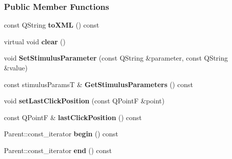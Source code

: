 \subsubsection*{Public Member Functions}
\begin{DoxyCompactItemize}
\item
\hypertarget{classapex_1_1_screen_result_af8e8f27a296d78d107947a315d6df1f1}{const Q\-String {\bfseries to\-X\-M\-L} () const }\label{classapex_1_1_screen_result_af8e8f27a296d78d107947a315d6df1f1}

\item
\hypertarget{classapex_1_1_screen_result_aef926fa16cabe427f26a7b265c150e92}{virtual void {\bfseries clear} ()}\label{classapex_1_1_screen_result_aef926fa16cabe427f26a7b265c150e92}

\item
\hypertarget{classapex_1_1_screen_result_a62dcb7eb2d37d51231970bb6a6b8db5f}{void {\bfseries Set\-Stimulus\-Parameter} (const Q\-String \&parameter, const Q\-String \&value)}\label{classapex_1_1_screen_result_a62dcb7eb2d37d51231970bb6a6b8db5f}

\item
\hypertarget{classapex_1_1_screen_result_a8479b6f3f72c7a20823b95fbd85dd765}{const stimulus\-Params\-T \& {\bfseries Get\-Stimulus\-Parameters} () const }\label{classapex_1_1_screen_result_a8479b6f3f72c7a20823b95fbd85dd765}

\item
\hypertarget{classapex_1_1_screen_result_a218e19ab8612f4ba40bf401729f2cfab}{void {\bfseries set\-Last\-Click\-Position} (const Q\-Point\-F \&point)}\label{classapex_1_1_screen_result_a218e19ab8612f4ba40bf401729f2cfab}

\item
\hypertarget{classapex_1_1_screen_result_a82265d3c2086c4c8235af7db6861803a}{const Q\-Point\-F \& {\bfseries last\-Click\-Position} () const }\label{classapex_1_1_screen_result_a82265d3c2086c4c8235af7db6861803a}

\item
\hypertarget{classapex_1_1_screen_result_a7510ab7f870afcb70d2d3e89d0dc2cb8}{Parent\-::const\-\_\-iterator {\bfseries begin} () const }\label{classapex_1_1_screen_result_a7510ab7f870afcb70d2d3e89d0dc2cb8}

\item
\hypertarget{classapex_1_1_screen_result_ae9931a4c9105a4c0f303bff7aa322689}{Parent\-::const\-\_\-iterator {\bfseries end} () const }\label{classapex_1_1_screen_result_ae9931a4c9105a4c0f303bff7aa322689}


\end{DoxyCompactItemize}
